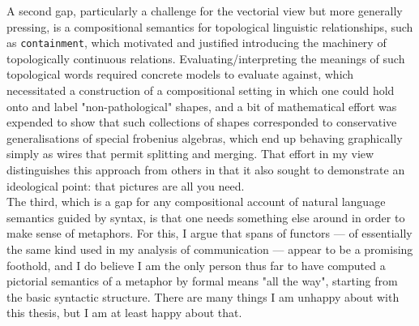 A second gap, particularly a challenge for the vectorial view but more generally pressing, is a compositional semantics for topological linguistic relationships, such as \texttt{containment}, which motivated and justified introducing the machinery of topologically continuous relations. Evaluating/interpreting the meanings of such topological words required concrete models to evaluate against, which necessitated a construction of a compositional setting in which one could hold onto and label "non-pathological" shapes, and a bit of mathematical effort was expended to show that such collections of shapes corresponded to conservative generalisations of special frobenius algebras, which end up behaving graphically simply as wires that permit splitting and merging. That effort in my view distinguishes this approach from others in that it also sought to demonstrate an ideological point: that pictures are all you need.\\

The third, which is a gap for any compositional account of natural language semantics guided by syntax, is that one needs something else around in order to make sense of metaphors. For this, I argue that spans of functors --- of essentially the same kind used in my analysis of communication --- appear to be a promising foothold, and I do believe I am the only person thus far to have computed a pictorial semantics of a metaphor by formal means "all the way", starting from the basic syntactic structure. There are many things I am unhappy about with this thesis, but I am at least happy about that.
